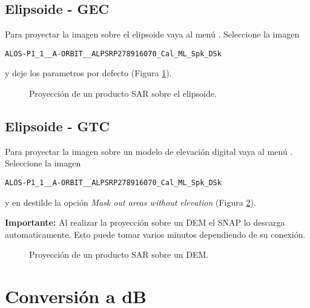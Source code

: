 \subsection{Elipsoide - GEC}

Para proyectar la imagen sobre el elipsoide vaya al menú . Seleccione la imagen
\begin{center} \texttt{ALOS-P1\_1\_\_A-ORBIT\_\_ALPSRP278916070\_Cal\_ML\_Spk\_DSk} \end{center} y deje los parametros por defecto (Figura \ref{fig:elipsoide}).

\begin{figure}[h!]
    \centering
    \hspace{1cm}
    \caption{Proyección de un producto SAR sobre el elipsoide.}
    \label{fig:elipsoide}
\end{figure}

\subsection{Elipsoide - GTC}

Para proyectar la imagen sobre un modelo de elevación digital vaya al menú . Seleccione la imagen
\begin{center} \texttt{ALOS-P1\_1\_\_A-ORBIT\_\_ALPSRP278916070\_Cal\_ML\_Spk\_DSk}
  \end{center}
  y en  destilde la opción \emph{Mask out areas without elevation} (Figura \ref{fig:gtc}).

{\bf Importante:} Al realizar la proyección sobre un DEM el SNAP lo descarga automaticamente. Esto puede tomar varios minutos dependiendo de su conexión.

\begin{figure}[h!]
    \centering
    \hspace{1cm}
    \caption{Proyección de un producto SAR sobre un DEM.}
    \label{fig:gtc}
\end{figure}

\section{Conversión a dB}

